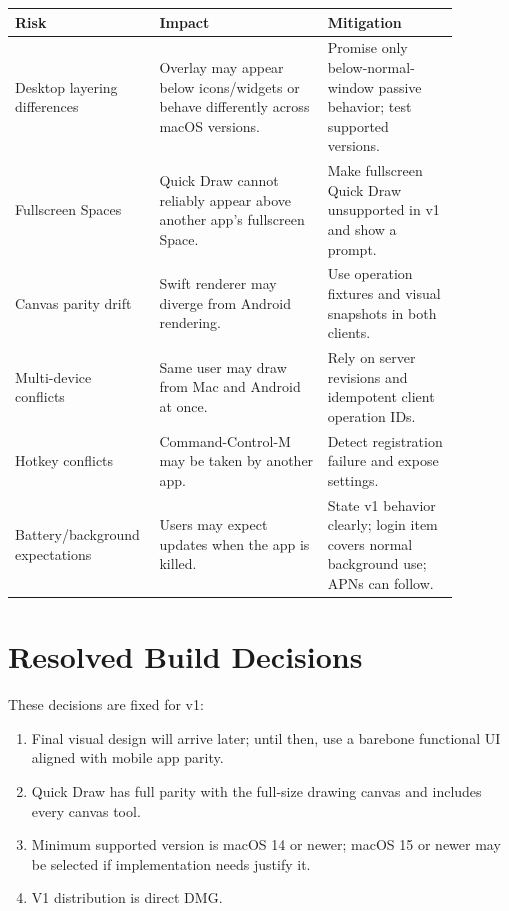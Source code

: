 \documentclass[11pt]{article}
\begin{document}
\begin{longtable}{p{0.24\linewidth} p{0.36\linewidth} p{0.28\linewidth}}
\toprule
\textbf{Risk} & \textbf{Impact} & \textbf{Mitigation} \\
\midrule
Desktop layering differences & Overlay may appear below icons/widgets or behave differently across macOS versions. & Promise only below-normal-window passive behavior; test supported versions. \\
Fullscreen Spaces & Quick Draw cannot reliably appear above another app's fullscreen Space. & Make fullscreen Quick Draw unsupported in v1 and show a prompt. \\
Canvas parity drift & Swift renderer may diverge from Android rendering. & Use operation fixtures and visual snapshots in both clients. \\
Multi-device conflicts & Same user may draw from Mac and Android at once. & Rely on server revisions and idempotent client operation IDs. \\
Hotkey conflicts & Command-Control-M may be taken by another app. & Detect registration failure and expose settings. \\
Battery/background expectations & Users may expect updates when the app is killed. & State v1 behavior clearly; login item covers normal background use; APNs can follow. \\
\bottomrule
\end{longtable}

\section{Resolved Build Decisions}

These decisions are fixed for v1:
\begin{enumerate}
  \item Final visual design will arrive later; until then, use a barebone functional UI aligned with mobile app parity.
  \item Quick Draw has full parity with the full-size drawing canvas and includes every canvas tool.
  \item Minimum supported version is macOS 14 or newer; macOS 15 or newer may be selected if implementation needs justify it.
  \item V1 distribution is direct DMG.
\end{enumerate}
\end{document}
